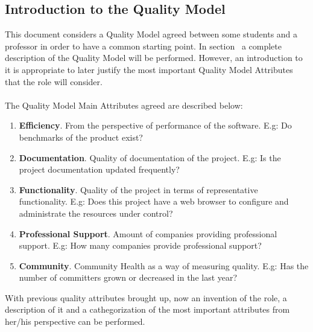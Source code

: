 \documentclass[11pt]{article}
\begin{document}
\begin{itemize}
\subsection{Introduction to the Quality Model}
This document considers a Quality Model agreed between some students and a professor in order to have a common starting point. In section~ a complete description of the Quality Model will be performed. However, an introduction to it is appropriate to later justify the most important Quality Model Attributes that the role will consider.\\
\\
The Quality Model Main Attributes agreed are described below:
\begin{enumerate}\itemsep0pt
\item{\textbf{Efficiency}}. From the perspective of performance of the software. E.g: Do benchmarks of the product exist? 
\item{\textbf{Documentation}}. Quality of documentation of the project. E.g: Is the project documentation updated frequently?
\item{\textbf{Functionality}}. Quality of the project in terms of representative functionality. E.g: Does this project have a web browser to configure and administrate the resources under control?
\item{\textbf{Professional Support}}. Amount of companies providing professional support. E.g: How many companies provide professional support?
\item{\textbf{Community}}. Community Health as a way of measuring quality. E.g: Has the number of committers grown or decreased in the last year?
\end{enumerate}

With previous quality attributes brought up, now an invention of the role, a description of it and a cathegorization of the most important attributes from her/his perspective can be performed.


\end{itemize}
\end{document}
